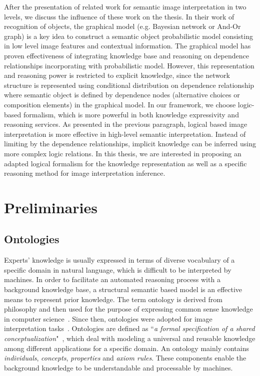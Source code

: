 \documentclass{article}
\begin{document}
After the presentation of related work for semantic image interpretation in two levels, we discuss the influence of these work on the thesis.
In their work of recognition of objects, the graphical model (e.g. Bayesian network or And-Or graph) is a key idea to construct a semantic object probabilistic model 
consisting in low level image features and contextual information. The graphical model has proven effectiveness of integrating knowledge base and reasoning on 
dependence relationships incorporating with probabilistic model. However, this representation and reasoning power is restricted to explicit knowledge, since the 
network structure is represented using conditional distribution on dependence relationship 
where semantic object is defined by dependence nodes (alternative choices or composition elements) in the graphical model.
In our framework, we choose logic-based formalism, which is more powerful in both knowledge expressivity and reasoning services.
As presented in the previous paragraph, logical based image interpretation is more effective in high-level semantic interpretation.
Instead of limiting by the dependence relationships, implicit knowledge can be inferred using more complex logic relations.
In this thesis, we are interested in proposing an adapted logical formalism for the knowledge representation as well as a specific reasoning method for image interpretation inference.
\section{Preliminaries}\label{sec:pre}
\subsection{Ontologies}
Experts' knowledge is usually expressed in terms of diverse vocabulary of a specific domain in natural language, which is difficult to be interpreted by machines.
In order to facilitate an automated reasoning process with a background knowledge base, a structural semantic based model is  an effective means to represent prior knowledge.
The term ontology is derived from philosophy and then used for the purpose of expressing common sense knowledge in computer science~\cite{alexander1986knowledge}.
Since then, ontologies were adopted for image interpretation tasks~\cite{bannour2011towards,Hudelot2008fuzzy,town2006ontological}.
Ontologies are defined as “\textit{a formal specification of a shared conceptualization}"~\cite{studer1998knowledge},
which deal with modeling a universal and reusable knowledge among different applications for a specific domain.
An ontology mainly contains  \textit{individuals}, \textit{concepts}, \textit{properties} and \textit{axiom rules}. 
These components enable the background knowledge to be understandable and processable by machines.
\end{document}
